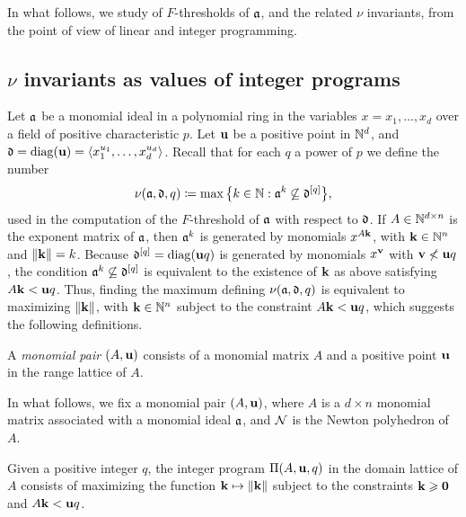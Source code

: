 \documentclass[11pt]{amsart}
\begin{document}
In what follows, we study of $F$-thresholds of $\mathfrak{a}$, and the related $\nu$ invariants, from the point of view of linear and integer programming.  

\subsection{$\nu$ invariants as values of integer programs}

Let $\mathfrak{a}$ be a monomial ideal in a polynomial ring in the variables $x=x_1,\ldots,x_d$ over a field of positive characteristic $p$.
Let $\mathbf{u}$ be a positive point in $\mathbb{N}^d$, and $\mathfrak{d} = \operatorname{diag}(\mathbf{u}) = \langle x_1^{u_1},\ldots,x_d^{u_d} \rangle$.
Recall that for each $q$ a power of $p$ we define the number
\[\nu(\mathfrak{a},\mathfrak{d},q) \coloneqq \max\big\{k\in \mathbb{N} : \mathfrak{a}^{k} \not\subseteq \mathfrak{d}^{[q]}\big\},\]
used in the computation of the $F$-threshold of $\mathfrak{a}$ with respect to $\mathfrak{d}$.
If $A \in \mathbb{N}^{d\times n}$ is the exponent matrix of $\mathfrak{a}$, then $\mathfrak{a}^k$ is generated by monomials $x^{A\mathbf{k}}$, with $\mathbf{k}\in \mathbb{N}^n$ and $\| \mathbf{k} \| = k$.
Because $\mathfrak{d}^{[q]} = \operatorname{diag}(\mathbf{u}q)$ is generated by monomials $x^{\mathbf{v}}$ with $\mathbf{v} \not< \mathbf{u}q$, the condition $\mathfrak{a}^{k} \not\subseteq \mathfrak{d}^{[q]}$ is equivalent to the existence of $\mathbf{k}$ as above satisfying $A\mathbf{k} < \mathbf{u}q$.
Thus, finding the maximum defining $\nu(\mathfrak{a},\mathfrak{d},q)$ is equivalent to maximizing $\| \mathbf{k} \|$, with $\mathbf{k} \in \mathbb{N}^n$ subject to the constraint $A\mathbf{k} < \mathbf{u}q$, which suggests the following definitions.

\begin{definition}
   A \emph{monomial pair} $(A, \mathbf{u})$ consists of a monomial matrix $A$ and a positive point $\mathbf{u}$ in the range lattice of $A$.
\end{definition}

In what follows, we fix a monomial pair $(A,\mathbf{u})$, where $A$ is a $d\times n$ monomial matrix associated with a monomial ideal $\mathfrak{a}$, and $\mathcal{N}$ is the Newton polyhedron of $A$.

\begin{definition}
   Given a positive integer $q$, the integer program $\Pi(A, \mathbf{u}, q)$ in the domain lattice of $A$ consists of maximizing the function $\mathbf{k} \mapsto \| \mathbf{k} \|$ subject to the constraints $\mathbf{k} \geqslant \mathbf{0}$ and $A \mathbf{k} < \mathbf{u}q$. 
\end{definition}
\end{document}
